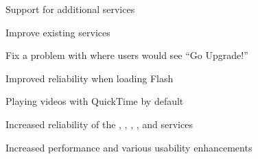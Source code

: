 \begin{changelog}
\item Support for additional services
\item Improve existing services
\end{changelog}

\begin{changelog}
\item Fix a problem with  where users would see ``Go Upgrade!'' 
\item Improved reliability when loading Flash 
\item Playing videos with QuickTime by default
\item Increased reliability of the , , , , and  services
\item Increased performance and various usability enhancements
\end{changelog}
